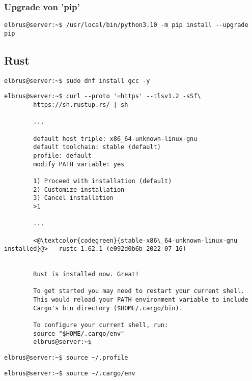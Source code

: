 \documentclass{article}
\begin{document}
	\subsubsection{Upgrade von 'pip'}
	\begin{lstlisting}[caption={Upgraden von 'pip'.}]
		elbrus@server:~$ /usr/local/bin/python3.10 -m pip install --upgrade pip
	\end{lstlisting}

	\subsection{Rust}
	
	\begin{lstlisting}[caption={Installieren von GNU Compiler Collection.}]
		elbrus@server:~$ sudo dnf install gcc -y
	\end{lstlisting}
	
	\lstset{style=commands}
	\begin{lstlisting}[caption={Installieren von Rust}]
		elbrus@server:~$ curl --proto '=https' --tlsv1.2 -sSf\
		https://sh.rustup.rs/ | sh
		 
		...
		 
		default host triple: x86_64-unknown-linux-gnu
		default toolchain: stable (default)
		profile: default
		modify PATH variable: yes
		
		1) Proceed with installation (default)
		2) Customize installation
		3) Cancel installation
		>1
		
		...
		
		<@\textcolor{codegreen}{stable-x86\_64-unknown-linux-gnu installed}@> - rustc 1.62.1 (e092d0b6b 2022-07-16)
		
		
		Rust is installed now. Great!
		
		To get started you may need to restart your current shell.
		This would reload your PATH environment variable to include
		Cargo's bin directory ($HOME/.cargo/bin).
		
		To configure your current shell, run:
		source "$HOME/.cargo/env"
		elbrus@server:~$
	\end{lstlisting}

	\begin{lstlisting}[caption={Laden der Variablen aus dem Terminal Profil.}]
		elbrus@server:~$ source ~/.profile
	\end{lstlisting}

	\begin{lstlisting}[caption={Hinzufügen des Befehls Cargo zu dem Pfad.}]
		elbrus@server:~$ source ~/.cargo/env
	\end{lstlisting}
\end{document}
